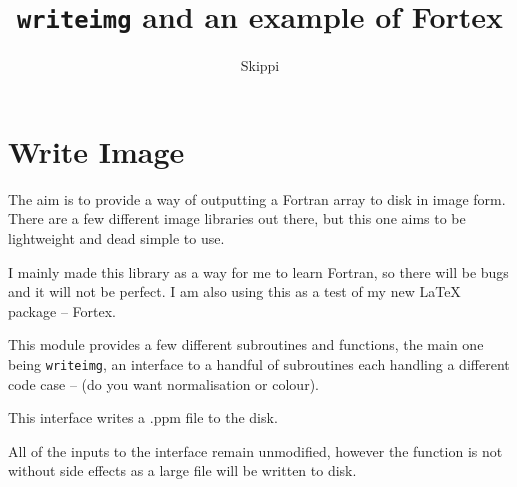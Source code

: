 \documentclass[a4paper]{article}
\title{\texttt{writeimg} and an example of Fortex}
\author{Skippi}
\begin{document}
\maketitle{} 

\section{Write Image}
\label{sec:writeimg}

The aim is to provide a way of outputting a Fortran array to disk in image form. There are a few different image libraries out there, but this one aims to be lightweight and dead simple to use. 

I mainly made this library as a way for me to learn Fortran, so there will be bugs and it will not be perfect. I am also using this as a test of my new \LaTeX{} package -- Fortex.

This module provides a few different subroutines and functions, the main one being \texttt{writeimg}, an interface to a handful of subroutines each handling a different code case -- (do you want normalisation or colour). 

This interface writes a .ppm file to the disk.

All of the inputs to the interface remain unmodified, however the function is not without side effects as a large file will be written to disk.
\end{document}
